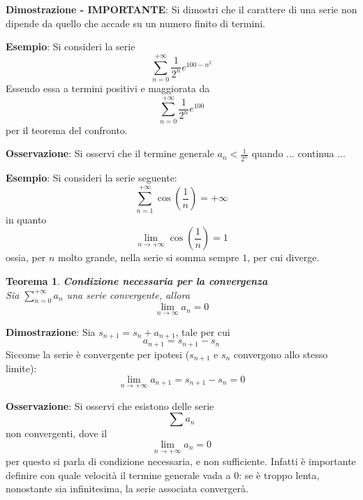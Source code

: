 \documentclass[a4paper]{extarticle}
\newtheorem{theorem}{Teorema}[section]
\begin{document}
\vspace{1em}
\noindent
\textbf{Dimostrazione - IMPORTANTE}: Si dimostri che il carattere di una serie non dipende da quello che accade su un numero finito di termini.

\vspace{1em}
\noindent
\textbf{Esempio}: Si consideri la serie
\[\sum_{n=0}^{+\infty} \frac{1}{2^n} e^{100-n^2}\]
Essendo essa a termini positivi e maggiorata da
\[\sum_{n=0}^{+\infty} \frac{1}{2^n} e^{100}\]
per il teorema del confronto.

\vspace{1em}
\noindent
\textbf{Osservazione}: Si osservi che il termine generale $a_n < \frac{1}{2^n}$ quando ... continua ...

\vspace{1em}
\noindent
\textbf{Esempio}: Si consideri la serie seguente:
\[\sum_{n=1}^{+\infty} \cos \left(\frac{1}{n}\right) = + \infty\]
in quanto
\[\lim_{n \to +\infty} \cos \left(\frac{1}{n}\right)=1\]
ossia, per $n$ molto grande, nella serie si somma sempre $1$, per cui diverge.

\vspace{1em}
\noindent
\begin{theorem} \textbf{Condizione necessaria per la convergenza}\\
    Sia $\sum_{n=0}^{+\infty} a_n$ una serie convergente, allora
    \[\lim_{n \to \infty} a_n=0\]
\end{theorem}

\vspace{1em}
\noindent
\textbf{Dimostrazione}: Sia $s_{n+1} = s_n + a_{n+1}$, tale per cui
\[a_{n+1} = s_{n+1} - s_n\]
Siccome la serie è convergente per ipotesi ($s_{n+1}$ e $s_n$ convergono allo stesso limite):
\[\lim_{n \to +\infty} a_{n+1} = s_{n+1} - s_n = 0\]

\vspace{1em}
\noindent
\textbf{Osservazione}: Si osservi che esistono delle serie
\[\sum a_n\]
non convergenti, dove il
\[\lim_{n \to +\infty} a_n = 0\]
per questo si parla di condizione necessaria, e non sufficiente. Infatti è importante definire con quale velocità il termine generale vada a $0$: se è troppo lenta, nonostante sia infinitesima, la serie associata convergerà.

\vspace{1em}
\noindent
\end{document}
